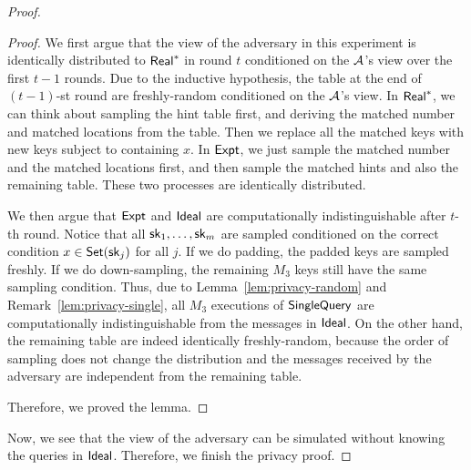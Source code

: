 \begin{proof}
\begin{proof}
        We first argue that the view of the adversary in this experiment is identically distributed to ${\sf Real}^*$ in round $t$ conditioned on the $\mathcal{A}$'s view over the first $t-1$ rounds. 
        Due to the inductive hypothesis, the table at the end of $(t-1)$-st round are freshly-random conditioned on the $\mathcal{A}$'s view. 
        In ${\sf Real}^*$, we can think about sampling the hint table first, and  deriving the matched number and matched locations from the table. 
        Then we replace all the matched keys with new keys subject to containing $x$.
        In ${\sf Expt}$, we just sample the matched number and the matched locations first, and then sample the matched hints and also the remaining table.
        These two processes are identically distributed.
        
         
        We then argue that ${\sf Expt}$ and ${\sf Ideal}$ are computationally indistinguishable after $t$-th round.
        Notice that all $\mathsf{sk}_{1},\dots,\mathsf{sk}_{m}$ are sampled conditioned on the correct condition $x\in\mathsf{Set}(\mathsf{sk}_j)$ for all $j$. 
        If we do padding, the padded keys are sampled freshly. If we do down-sampling, the remaining $M_3$ keys still have the same sampling condition.
        Thus, due to Lemma~\ref{lem:privacy-random} and Remark~\ref{lem:privacy-single}, all $M_3$ executions of $\mathsf{SingleQuery}$ are computationally indistinguishable from the messages in ${\sf Ideal}$.
        On the other hand, the remaining table are indeed identically freshly-random, because the order of sampling does not change the distribution and the messages received by the adversary are independent from the remaining table. 
        
        Therefore, we proved the lemma.
    \end{proof}
    
    Now, we see that the view of the adversary can be simulated without knowing the queries in ${\sf Ideal}$. 
    Therefore, we finish the privacy proof.
    
\end{proof}


